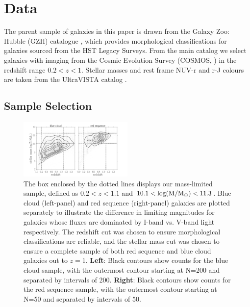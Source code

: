 \documentclass[useAMS,usenatbib]{mn2e}
\begin{document}
\section{Data}
\label{sec:Data}

The parent sample of galaxies in this paper is drawn from the Galaxy Zoo: Hubble (GZH) catalogue \citep{Willett2017}, which provides morphological classifications for galaxies sourced from the HST Legacy Surveys. From the main catalog we select galaxies with imaging from the Cosmic Evolution Survey (COSMOS, \citet{Scoville2007}) in the redshift range $0.2<z<1$. Stellar masses and rest frame NUV-r and r-J colours are taken from the UltraVISTA catalog \citep{McCracken2012,Ilbert2013}.

\subsection{Sample Selection}
\label{sec:sampleselection}

\begin{figure}
\centering
\includegraphics[width=0.5\textwidth]{figures/mass_selection.pdf}
\caption{The box enclosed by the dotted lines displays our mass-limited sample, defined as $0.2<z<1.1$ and $10.1<\rm \log(M/M_{\odot})<11.3$. Blue cloud (left-panel) and red sequence (right-panel) galaxies are plotted separately to illustrate the difference in limiting magnitudes for galaxies whose fluxes are dominated by I-band vs. V-band light respectively. The redshift cut was chosen to ensure morphological classifications are reliable, and the stellar mass cut was chosen to ensure a complete sample of both red sequence and blue cloud galaxies out to $z=1$. \textbf{Left}: Black contours show counts for the blue cloud sample, with the outermost contour starting at N=200 and separated by intervals of 200. \textbf{Right}: Black contours show counts for the red sequence sample, with the outermost contour starting at N=50 and separated by intervals of 50. }
\label{masscut}
\end{figure}
\end{document}
